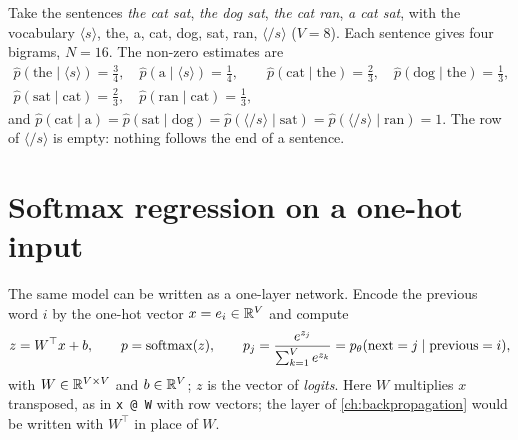 \begin{notechapter}
\begin{example}\label{bigram-models:ex:corpus}
Take the sentences \emph{the cat sat}, \emph{the dog sat}, \emph{the cat ran}, \emph{a cat sat}, with the vocabulary
$\langle s\rangle$, the, a, cat, dog, sat, ran, $\langle/s\rangle$ ($V = 8$). Each sentence gives four bigrams, $N = 16$. The non-zero
estimates are
\begin{gather*}
  \hat p(\text{the}\mid\langle s\rangle) = \tfrac34,\quad \hat p(\text{a}\mid\langle s\rangle) = \tfrac14,\qquad
  \hat p(\text{cat}\mid\text{the}) = \tfrac23,\quad \hat p(\text{dog}\mid\text{the}) = \tfrac13,\\
  \hat p(\text{sat}\mid\text{cat}) = \tfrac23,\quad \hat p(\text{ran}\mid\text{cat}) = \tfrac13,
\end{gather*}
and $\hat p(\text{cat}\mid\text{a}) = \hat p(\text{sat}\mid\text{dog}) = \hat p(\langle/s\rangle\mid\text{sat}) = \hat p(\langle/s\rangle\mid\text{ran}) = 1$. The row of $\langle/s\rangle$ is empty: nothing follows the end of a
sentence.
\end{example}

\section{Softmax regression on a one-hot input}\label{bigram-models:sec:softmax}

The same model can be written as a one-layer network. Encode the previous word $i$ by the
one-hot vector $x = e_i\in\mathbb{R}^V$ and compute
\[
  z = W^\top x + b,\qquad p = \operatorname{softmax}(z),\qquad p_j = \frac{e^{z_j}}{\sum_{k=1}^Ve^{z_k}} = p_\theta(\text{next} = j\mid\text{previous} = i),
\]
with $W\in\mathbb{R}^{V\times V}$ and $b\in\mathbb{R}^V$; $z$ is the vector of \emph{logits}. Here $W$ multiplies $x$ transposed, as in
\texttt{x @ W} with row vectors; the layer of \cref{ch:backpropagation} would
be written with $W^\top$ in place of $W$.


\end{notechapter}
